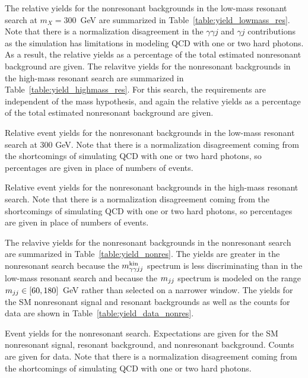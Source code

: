 The relative yields for the nonresonant backgrounds in the low-mass resonant search at $m_X = 300$~GeV
are summarized in
Table~\ref{table:yield_lowmass_res}. Note that there is a normalization disagreement in the
$\gamma\gamma j$ and $\gamma j$ contributions as the simulation has limitations in modeling
QCD with one or two hard photons. As a result, the relative yields as a percentage of the total estimated
nonresonant background are given.
The relavitve yields for the nonresonant backgrounds in the high-mass resonant search are summarized in
Table~\ref{table:yield_highmass_res}. For this search, the requirements are independent of
the mass hypothesis, and again the relative yields as a percentage of the total estimated nonresonant
background are given.

\begin{table}[htbp!]
  \centering
  \renewcommand{\arraystretch}{1.4}
  \caption{Relative event yields for the nonresonant backgrounds in the low-mass resonant search
at 300 GeV. Note that there is a normalization disagreement coming from the shortcomings of
simulating QCD with one or two hard photons, so percentages are given in place of numbers
of events.}
  
  \label{table:yield_lowmass_res}
\end{table}

\begin{table}[htbp!]
  \centering
  \renewcommand{\arraystretch}{1.4}
  \caption{Relative event yields for the nonresonant backgrounds in the high-mass resonant search.
Note that there is a normalization disagreement coming from the shortcomings of simulating QCD with one
or two hard photons, so percentages are given in place of numbers of events.}
  
  \label{table:yield_highmass_res}
\end{table}

The relavive yields for the nonresonant backgrounds in the nonresonant search are summarized in
Table~\ref{table:yield_nonres}. The yields are greater in the nonresonant search
because the $m_{\gamma\gamma jj}^{\rm kin}$ spectrum is less
discriminating than in the low-mass resonant search and because the $m_{jj}$ spectrum is
modeled on the range $m_{jj} \in [60,180]$~GeV rather than selected on a narrower window.
The yields for the SM nonresonant signal and resonant backgrounds as well as the counts for
data are shown in Table~\ref{table:yield_data_nonres}.

\begin{table}[htbp!]
  \centering
  \renewcommand{\arraystretch}{1.4}
  \caption{Event yields for the nonresonant search. Expectations are given for
the SM nonresonant signal, resonant background, and nonresonant background.
Counts are given for data. Note that
there is a normalization disagreement coming from the shortcomings of simulating QCD with one
or two hard photons.}
  
  \label{table:yield_nonres}
\end{table}

